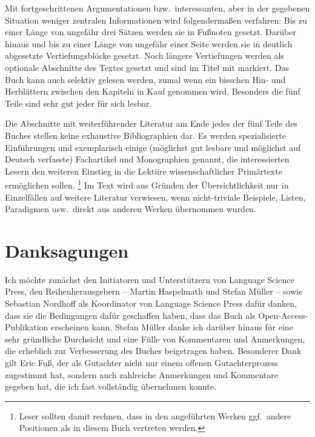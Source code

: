 Mit fortgeschrittenen Argumentationen bzw.\ interessanten, aber in der gegebenen Situation weniger zentralen Informationen wird folgendermaßen verfahren:
Bis zu einer Länge von ungefähr drei Sätzen werden sie in Fußnoten gesetzt.
Darüber hinaus und bis zu einer Länge von ungefähr einer Seite werden sie in deutlich abgesetzte Vertiefungsblöcke gesetzt.
Noch längere Vertiefungen werden als optionale Abschnitte des Textes gesetzt und sind im Titel mit \Opsional markiert.
Das Buch kann auch selektiv gelesen werden, zumal wenn ein bisschen Hin- und Herblättern zwischen den Kapiteln in Kauf genommen wird.
Besonders die fünf Teile sind sehr gut jeder für sich lesbar.

Die Abschnitte mit weiterführender Literatur am Ende jedes der fünf Teile des Buches stellen keine exhaustive Bibliographien dar.
Es werden spezialisierte Einführungen und exemplarisch einige (möglichst gut lesbare und möglichst auf Deutsch verfasste) Fachartikel und Monographien genannt, die interessierten Lesern den weiteren Einstieg in die Lektüre wissenschaftlicher Primärtexte ermöglichen sollen.%
\footnote{Leser sollten damit rechnen, dass in den angeführten Werken ggf.\ andere Positionen als in diesem Buch vertreten werden.}
Im Text wird aus Gründen der Übersichtlichkeit nur in Einzelfällen auf weitere Literatur verwiesen, \zB wenn nicht-triviale Beispiele, Listen, Paradigmen usw.\ direkt aus anderen Werken übernommen wurden.

\section*{Danksagungen}

Ich möchte zunächst den Initiatoren und Unterstützern von Language Science Press, den Reihenherausgebern -- Martin Haspelmath und Stefan Müller -- sowie Sebastian Nordhoff als Koordinator von Language Science Press dafür danken, dass sie die Bedingungen dafür geschaffen haben, dass das Buch als Open-Access-Publikation erscheinen kann.
Stefan Müller danke ich darüber hinaus für eine sehr gründliche Durchsicht und eine Fülle von Kommentaren und Anmerkungen, die erheblich zur Verbesserung des Buches beigetragen haben.
Besonderer Dank gilt Eric Fuß, der als Gutachter nicht nur einem offenen Gutachterprozess zugestimmt hat, sondern auch zahlreiche Anmerkungen und Kommentare gegeben hat, die ich fast vollständig übernehmen konnte.

